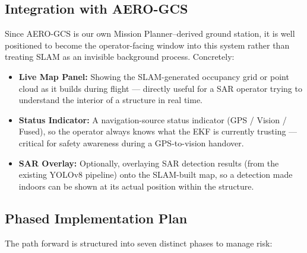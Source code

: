 \documentclass[11pt,a4paper]{article}
\begin{document}
\subsection{Integration with AERO-GCS}
Since AERO-GCS is our own Mission Planner--derived ground station, it is well positioned to become the operator-facing window into this system rather than treating SLAM as an invisible background process. Concretely:
\begin{itemize}
    \item \textbf{Live Map Panel:} Showing the SLAM-generated occupancy grid or point cloud as it builds during flight --- directly useful for a SAR operator trying to understand the interior of a structure in real time.
    \item \textbf{Status Indicator:} A navigation-source status indicator (GPS / Vision / Fused), so the operator always knows what the EKF is currently trusting --- critical for safety awareness during a GPS-to-vision handover.
    \item \textbf{SAR Overlay:} Optionally, overlaying SAR detection results (from the existing YOLOv8 pipeline) onto the SLAM-built map, so a detection made indoors can be shown at its actual position within the structure.
\end{itemize}

\subsection{Phased Implementation Plan}
The path forward is structured into seven distinct phases to manage risk:
\end{document}

